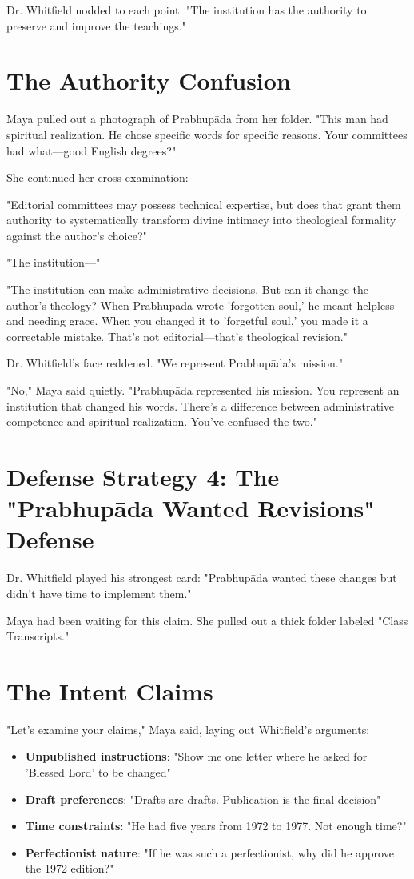 \documentclass[11pt,twoside]{book}
\begin{document}
Dr. Whitfield nodded to each point. "The institution has the authority to preserve and improve the teachings."
\section*{The Authority Confusion}
\label{sec:org5de98ca}

Maya pulled out a photograph of Prabhupāda from her folder. "This man had spiritual realization. He chose specific words for specific reasons. Your committees had what—good English degrees?"

She continued her cross-examination:

"Editorial committees may possess technical expertise, but does that grant them authority to systematically transform divine intimacy into theological formality against the author's choice?"

"The institution—"

"The institution can make administrative decisions. But can it change the author's theology? When Prabhupāda wrote 'forgotten soul,' he meant helpless and needing grace. When you changed it to 'forgetful soul,' you made it a correctable mistake. That's not editorial—that's theological revision."

Dr. Whitfield's face reddened. "We represent Prabhupāda's mission."

"No," Maya said quietly. "Prabhupāda represented his mission. You represent an institution that changed his words. There's a difference between administrative competence and spiritual realization. You've confused the two."
\section*{Defense Strategy 4: The "Prabhupāda Wanted Revisions" Defense}
\label{sec:org83fbeb0}

Dr. Whitfield played his strongest card: "Prabhupāda wanted these changes but didn't have time to implement them."

Maya had been waiting for this claim. She pulled out a thick folder labeled "Class Transcripts."
\section*{The Intent Claims}
\label{sec:org43c36b7}

"Let's examine your claims," Maya said, laying out Whitfield's arguments:

\begin{itemize}
\item \textbf{\textbf{Unpublished instructions}}: "Show me one letter where he asked for 'Blessed Lord' to be changed"
\item \textbf{\textbf{Draft preferences}}: "Drafts are drafts. Publication is the final decision"
\item \textbf{\textbf{Time constraints}}: "He had five years from 1972 to 1977. Not enough time?"
\item \textbf{\textbf{Perfectionist nature}}: "If he was such a perfectionist, why did he approve the 1972 edition?"
\end{itemize}
\end{document}
